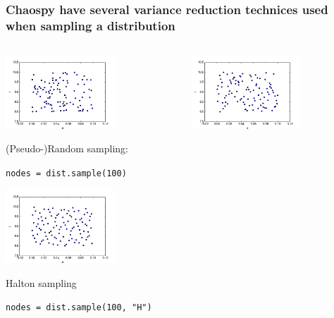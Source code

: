 \documentclass[handout]{beamer}
\begin{document}
\begin{frame}[fragile]
 \frametitle{Chaospy have several variance reduction technices used when sampling a distribution}
 \begin{columns}
     \begin{center}
                \includegraphics[width=0.65\textwidth]{samples.png}

                (Pseudo-)Random sampling:

                \scriptsize
                \verb;nodes = dist.sample(100);
                \normalsize

                \includegraphics[width=0.65\textwidth]{samples_H.png}

                Halton sampling

                \scriptsize
                \verb;nodes = dist.sample(100, "H");
                \normalsize

     \end{center}
     \begin{center}
                  \includegraphics[width=0.65\textwidth]{samples_L.png}


\end{center}
\end{columns}
\end{frame}
\end{document}
